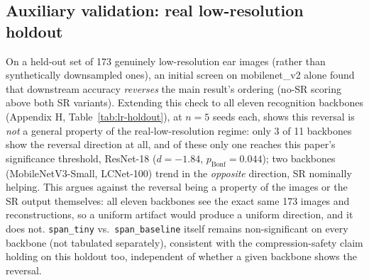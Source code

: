 \documentclass[pdflatex,sn-vancouver-num]{sn-jnl}
\begin{document}
\subsection{Auxiliary validation: real low-resolution holdout}
\label{sec:res-lr-holdout}

On a held-out set of 173 genuinely low-resolution ear images (rather than synthetically downsampled ones), an initial screen on mobilenet\_v2 alone found that downstream accuracy \emph{reverses} the main result's ordering (no-SR scoring above both SR variants). Extending this check to all eleven recognition backbones (Appendix H, Table~\ref{tab:lr-holdout}), at $n=5$ seeds each, shows this reversal is \emph{not} a general property of the real-low-resolution regime: only 3 of 11 backbones show the reversal direction at all, and of these only one reaches this paper's significance threshold, ResNet-18 ($d{=}{-}1.84$, $p_{\text{Bonf}}{=}0.044$); two backbones (MobileNetV3-Small, LCNet-100) trend in the \emph{opposite} direction, SR nominally helping. This argues against the reversal being a property of the images or the SR output themselves: all eleven backbones see the exact same 173 images and reconstructions, so a uniform artifact would produce a uniform direction, and it does not. \texttt{span\_tiny} vs.\ \texttt{span\_baseline} itself remains non-significant on every backbone (not tabulated separately), consistent with the compression-safety claim holding on this holdout too, independent of whether a given backbone shows the reversal.
\end{document}
